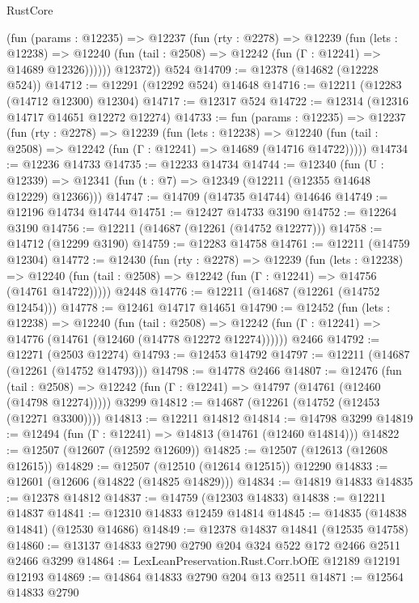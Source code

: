 \begin{lexlean}{RustCore}
\begin{coremodule}
          (fun (params : @12235) =>
          @12237
            (fun (rty : @2278) =>
            @12239
              (fun (lets : @12238) =>
              @12240 (fun (tail : @2508) => @12242 (fun (Γ : @12241) => @14689 @12326))))))
        @12372))
    @524
@14709 := @12378 (@14682 (@12228 @524))
@14712 := @12291 (@12292 @524) @14648
@14716 := @12211 (@12283 (@14712 @12300) @12304)
@14717 := @12317 @524
@14722 := @12314 (@12316 @14717 @14651 @12272 @12274)
@14733 := fun (params : @12235) =>
  @12237
    (fun (rty : @2278) =>
    @12239
      (fun (lets : @12238) =>
      @12240 (fun (tail : @2508) => @12242 (fun (Γ : @12241) => @14689 (@14716 @14722)))))
@14734 := @12236 @14733
@14735 := @12233 @14734
@14744 := @12340
    (fun (U : @12339) => @12341 (fun (t : @7) => @12349 (@12211 (@12355 @14648 @12229) @12366)))
@14747 := @14709 (@14735 @14744) @14646
@14749 := @12196 @14734 @14744
@14751 := @12427 @14733 @3190
@14752 := @12264 @3190
@14756 := @12211 (@14687 (@12261 (@14752 @12277)))
@14758 := @14712 (@12299 @3190)
@14759 := @12283 @14758
@14761 := @12211 (@14759 @12304)
@14772 := @12430
    (fun (rty : @2278) =>
    @12239
      (fun (lets : @12238) =>
      @12240 (fun (tail : @2508) => @12242 (fun (Γ : @12241) => @14756 (@14761 @14722)))))
    @2448
@14776 := @12211 (@14687 (@12261 (@14752 @12454)))
@14778 := @12461 @14717 @14651
@14790 := @12452
    (fun (lets : @12238) =>
    @12240
      (fun (tail : @2508) =>
      @12242 (fun (Γ : @12241) => @14776 (@14761 (@12460 (@14778 @12272 @12274))))))
    @2466
@14792 := @12271 (@2503 @12274)
@14793 := @12453 @14792
@14797 := @12211 (@14687 (@12261 (@14752 @14793)))
@14798 := @14778 @2466
@14807 := @12476
    (fun (tail : @2508) => @12242 (fun (Γ : @12241) => @14797 (@14761 (@12460 (@14798 @12274)))))
    @3299
@14812 := @14687 (@12261 (@14752 (@12453 (@12271 @3300))))
@14813 := @12211 @14812
@14814 := @14798 @3299
@14819 := @12494 (fun (Γ : @12241) => @14813 (@14761 (@12460 @14814)))
@14822 := @12507 (@12607 (@12592 @12609))
@14825 := @12507 (@12613 (@12608 @12615))
@14829 := @12507 (@12510 (@12614 @12515)) @12290
@14833 := @12601 (@12606 (@14822 (@14825 @14829)))
@14834 := @14819 @14833
@14835 := @12378 @14812
@14837 := @14759 (@12303 @14833)
@14838 := @12211 @14837
@14841 := @12310 @14833 @12459 @14814
@14845 := @14835 (@14838 @14841) (@12530 @14686)
@14849 := @12378 @14837 @14841 (@12535 @14758)
@14860 := @13137 @14833 @2790 @2790 @204 @324 @522 @172 @2466 @2511 @2466 @3299
@14864 := LexLeanPreservation.Rust.Corr.bOfE @12189 @12191 @12193
@14869 := @14864 @14833 @2790 @204 @13 @2511
@14871 := @12564 @14833 @2790

\end{coremodule}
\end{lexlean}
